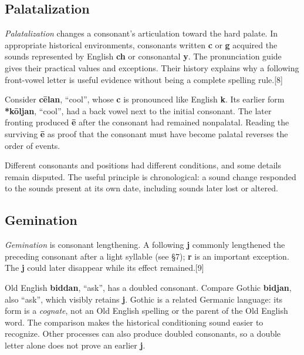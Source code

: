 \subsection*{Palatalization}
\emph{Palatalization} changes a consonant’s articulation toward the hard palate. In appropriate historical environments, consonants written \textbf{c} or \textbf{g} acquired the sounds represented by English \textbf{ch} or consonantal \textbf{y}. The pronunciation guide gives their practical values and exceptions. Their history explains why a following front-vowel letter is useful evidence without being a complete spelling rule.[8]\par
Consider \textbf{cēlan}, “cool”, whose \textbf{c} is pronounced like English \textbf{k}. Its earlier form \textbf{*kōljan}, “cool”, had a back vowel next to the initial consonant. The later fronting produced \textbf{ē} after the consonant had remained nonpalatal. Reading the surviving \textbf{ē} as proof that the consonant must have become palatal reverses the order of events.\par
Different consonants and positions had different conditions, and some details remain disputed. The useful principle is chronological: a sound change responded to the sounds present at its own date, including sounds later lost or altered.\par
\subsection*{Gemination}
\emph{Gemination} is consonant lengthening. A following \textbf{j} commonly lengthened the preceding consonant after a light syllable (see §7); \textbf{r} is an important exception. The \textbf{j} could later disappear while its effect remained.[9]\par
Old English \textbf{biddan}, “ask”, has a doubled consonant. Compare Gothic \textbf{bidjan}, also “ask”, which visibly retains \textbf{j}. Gothic is a related Germanic language: its form is a \emph{cognate}, not an Old English spelling or the parent of the Old English word. The comparison makes the historical conditioning sound easier to recognize. Other processes can also produce doubled consonants, so a double letter alone does not prove an earlier \textbf{j}.\par
